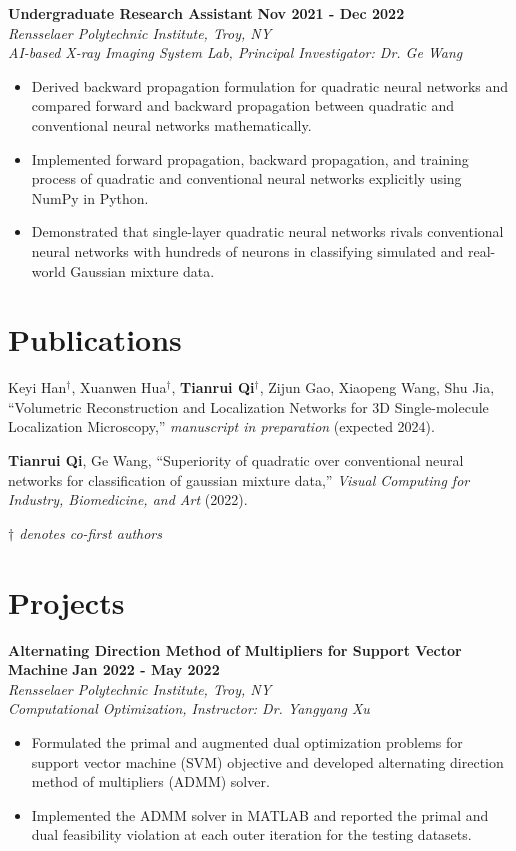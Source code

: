 \documentclass[letterpaper, 10pt]{article}
\newcommand{\subsectionvspace}{\vspace{6pt}}
\begin{document}
    \subsectionvspace

    \textbf{Undergraduate Research Assistant} \hfill 
    \textbf{Nov 2021 - Dec 2022} \\
    \textit{Rensselaer Polytechnic Institute, Troy, NY} \\
    \textit{AI-based X-ray Imaging System Lab, Principal Investigator: Dr. Ge Wang}
    \begin{itemize}
        \item Derived backward propagation formulation for quadratic neural networks and compared forward and backward propagation between quadratic and conventional neural networks mathematically.
        \item Implemented forward propagation, backward propagation, and training process of quadratic and conventional neural networks explicitly using NumPy in Python.
        \item Demonstrated that single-layer quadratic neural networks rivals conventional neural networks with hundreds of neurons in classifying simulated and real-world Gaussian mixture data.
    \end{itemize}


\section{Publications}


    Keyi Han$^\dag$, Xuanwen Hua$^\dag$, \textbf{Tianrui Qi}$^\dag$, Zijun Gao, Xiaopeng Wang, Shu Jia, ``Volumetric Reconstruction and Localization Networks for 3D Single-molecule Localization Microscopy,'' \textit{manuscript in preparation} (expected 2024).

    \subsectionvspace

    \textbf{Tianrui Qi}, Ge Wang, ``Superiority of quadratic over conventional neural networks for classification of gaussian mixture data,'' \textit{Visual Computing for Industry, Biomedicine, and Art} (2022).

    \subsectionvspace

    \textit{$\dag$ denotes co-first authors}


\section{Projects}


    \textbf{Alternating Direction Method of Multipliers for Support Vector Machine} \hfill 
    \textbf{Jan 2022 - May 2022} \\
    \textit{Rensselaer Polytechnic Institute, Troy, NY} \\
    \textit{Computational Optimization, Instructor: Dr. Yangyang Xu}
    \begin{itemize}
        \item Formulated the primal and augmented dual optimization problems for support vector machine (SVM) objective and developed alternating direction method of multipliers (ADMM) solver.
        \item Implemented the ADMM solver in MATLAB and reported the primal and dual feasibility violation at each outer iteration for the testing datasets.
    \end{itemize}
\end{document}
